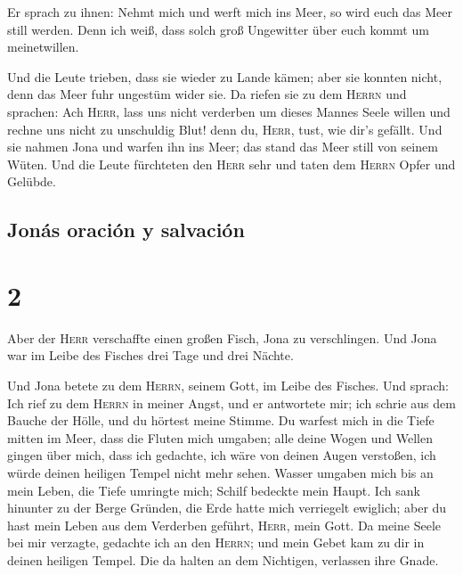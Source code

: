  Er sprach zu ihnen: Nehmt mich und werft mich ins Meer,
so wird euch das Meer still werden. Denn ich weiß, dass solch groß
Ungewitter über euch kommt um meinetwillen.

 Und die Leute trieben, dass sie wieder zu Lande kämen;
aber sie konnten nicht, denn das Meer fuhr ungestüm wider sie.
 Da riefen sie zu dem \textsc{Herrn} und sprachen: Ach
\textsc{Herr}, lass uns nicht verderben um dieses Mannes Seele willen
und rechne uns nicht zu unschuldig Blut! denn du, \textsc{Herr}, tust,
wie dir's gefällt.  Und sie nahmen Jona und warfen ihn
ins Meer; das stand das Meer still von seinem Wüten.  Und
die Leute fürchteten den \textsc{Herr} sehr und taten dem \textsc{Herrn}
Opfer und Gelübde.

\hypertarget{jonuxe1s-oraciuxf3n-y-salvaciuxf3n}{%
\subsection{Jonás oración y
salvación}\label{jonuxe1s-oraciuxf3n-y-salvaciuxf3n}}

\hypertarget{section-1}{%
\section{2}\label{section-1}}

 Aber der \textsc{Herr} verschaffte einen großen Fisch,
Jona zu verschlingen. Und Jona war im Leibe des Fisches drei Tage und
drei Nächte.

 Und Jona betete zu dem \textsc{Herrn}, seinem Gott, im
Leibe des Fisches.  Und sprach: Ich rief zu dem
\textsc{Herrn} in meiner Angst, und er antwortete mir; ich schrie aus
dem Bauche der Hölle, und du hörtest meine Stimme.  Du
warfest mich in die Tiefe mitten im Meer, dass die Fluten mich umgaben;
alle deine Wogen und Wellen gingen über mich,  dass ich
gedachte, ich wäre von deinen Augen verstoßen, ich würde deinen heiligen
Tempel nicht mehr sehen.  Wasser umgaben mich bis an mein
Leben, die Tiefe umringte mich; Schilf bedeckte mein Haupt.
 Ich sank hinunter zu der Berge Gründen, die Erde hatte
mich verriegelt ewiglich; aber du hast mein Leben aus dem Verderben
geführt, \textsc{Herr}, mein Gott.  Da meine Seele bei mir
verzagte, gedachte ich an den \textsc{Herrn}; und mein Gebet kam zu dir
in deinen heiligen Tempel.  Die da halten an dem
Nichtigen, verlassen ihre Gnade.

